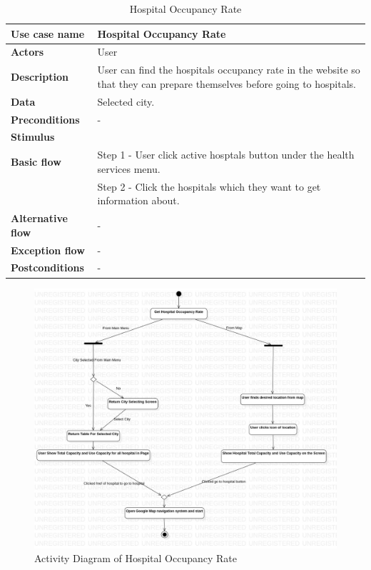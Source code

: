 \begin{center}
    \begin{table}[H]
        \begin{tabular}{| m{3cm}| m{10cm} |}
            \hline
            \textbf{Use case name} & Hospital Occupancy Rate\\
            \hline
            \textbf{Actors} & User\\
            \hline
            \textbf{Description} & User can find the hospitals occupancy rate in the website so that they can prepare themselves before going to hospitals.  \\
            \hline
            \textbf{Data} & Selected city.\\
            \hline
            \textbf{Preconditions} & - \\
            \hline
            \textbf{Stimulus} & \\
            \hline
            \textbf{Basic flow} & Step 1 - User click active hosptals button under the health services menu.\\
                                & Step 2 - Click the hospitals which they want to get information about. \\
            \hline
            \textbf{Alternative flow} & - \\
            \hline
            \textbf{Exception flow} & - \\
            \hline
            \textbf{Postconditions} & - \\
            \hline
        \end{tabular}
        \caption[Hospital Occupancy Rate]{Hospital Occupancy Rate}
    \end{table}
\end{center}

\begin{figure}[H]
    \includegraphics[scale = 0.4]{assets/ActivityDiagramSuggestion.jpg}
    \caption[Activity Diagram of Hospital Occupancy Rate]{Activity Diagram of Hospital Occupancy Rate}
\end{figure}


